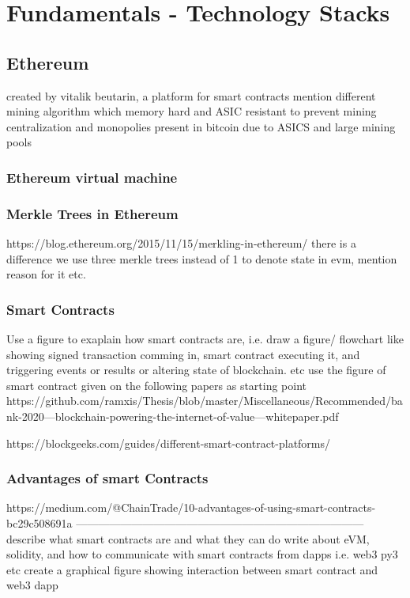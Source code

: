 \section{Fundamentals - Technology Stacks}
\subsection{Ethereum}\label{eth}
created by vitalik beutarin, a platform for smart contracts
mention different mining algorithm which memory hard and ASIC resistant to prevent mining centralization and monopolies present in bitcoin due to ASICS and large mining pools

\subsubsection{Ethereum virtual machine}
\subsubsection{Merkle Trees in Ethereum}
https://blog.ethereum.org/2015/11/15/merkling-in-ethereum/
there is a difference we use three merkle trees instead of 1 to denote  state in evm, mention reason for it etc.
\subsubsection{Smart Contracts}
Use a figure to exaplain how smart contracts are, i.e. draw a figure/ flowchart like showing signed transaction comming in, smart contract executing it, and triggering events or results or altering state of blockchain. etc
use the figure of smart contract given on the following papers as starting point
https://github.com/ramxis/Thesis/blob/master/Miscellaneous/Recommended/bank-2020---blockchain-powering-the-internet-of-value---whitepaper.pdf

https://blockgeeks.com/guides/different-smart-contract-platforms/

\subsubsection{Advantages of smart Contracts}
https://medium.com/@ChainTrade/10-advantages-of-using-smart-contracts-bc29c508691a
------------------------------------------------------------------------------
describe what smart contracts are and what they can do
write about eVM, solidity, and how to communicate with smart contracts from dapps i.e. web3 py3 etc
create a graphical figure showing interaction between smart contract and web3 dapp

